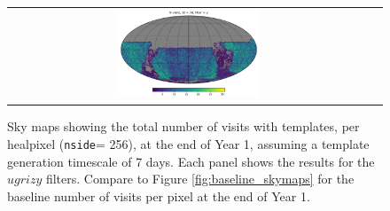 \documentclass[preprintm,linenumbers]{aastex631}
\newcommand{\nside}{\texttt{nside}\xspace}
\begin{document}
\begin{figure}
\begin{tabular}{c c}
				\includegraphics[width=0.4\textwidth]{results/skymaps/skymap_first_year_one_snap_v4_0_10yrs_db_noDD_noTwi_tscale-7_nside-256_doAllTemplateMetrics_reduceCount_y_noDD_noTwi.pdf} \\
			\end{tabular}
			\caption{Sky maps showing the total number of visits with templates, per healpixel (\nside = 256), at the end of Year 1, assuming a template generation timescale of 7 days. Each panel shows the results for the $ugrizy$ filters.
				Compare to Figure \ref{fig:baseline_skymaps} for the baseline number of visits per pixel at the end of Year 1.
			}
			\label{fig:template_skymaps_tscale-7}
		\end{figure}
\end{document}
